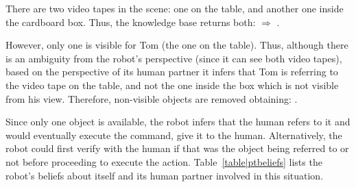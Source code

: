 There are two video tapes in the scene: one on the table, and another one
inside the cardboard box. Thus, the knowledge base returns both: $\Rightarrow$
. 

However, only one is visible for Tom (the one on the
table). Thus, although there is an ambiguity from the robot's perspective
(since it can see both video tapes), based on the perspective of its human
partner it infers that Tom is referring to the video tape on the table, and not
the one inside the box which is not visible from his view. Therefore,
non-visible objects are removed obtaining: .

Since only one object is available, the robot infers
that the human refers to it and would eventually execute the command, \ie give
it to the human. Alternatively, the robot could first verify with the human if
that was the object being referred to or not before proceeding to execute the
action. Table~\ref{table|ptbeliefs} lists the robot's beliefs about itself and
its human partner involved in this situation.

